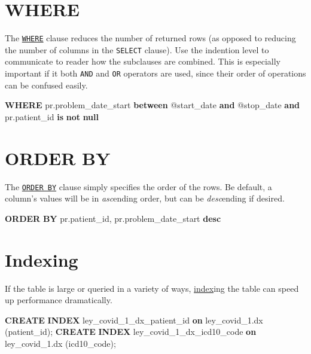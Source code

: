 \documentclass[
]{book}
\newenvironment{Shaded}{\begin{snugshade}}{\end{snugshade}}
\newcommand{\KeywordTok}[1]{\textcolor[rgb]{0.13,0.29,0.53}{\textbf{#1}}}
\newcommand{\NormalTok}[1]{#1}
\begin{document}
\hypertarget{sql-where}{%
\section{WHERE}\label{sql-where}}

The \href{https://www.w3schools.com/sql/sql_where.asp}{\texttt{WHERE}} clause reduces the number of returned rows (as opposed to reducing the number of columns in the \texttt{SELECT} clause). Use the indention level to communicate to reader how the subclauses are combined. This is especially important if it both \texttt{AND} and \texttt{OR} operators are used, since their order of operations can be confused easily.

\begin{Shaded}
\begin{Highlighting}[]
\KeywordTok{WHERE}
\NormalTok{  pr.problem\_date\_start }\KeywordTok{between}\NormalTok{ @start\_date }\KeywordTok{and}\NormalTok{ @stop\_date}
  \KeywordTok{and}
\NormalTok{  pr.patient\_id }\KeywordTok{is} \KeywordTok{not} \KeywordTok{null}
\end{Highlighting}
\end{Shaded}

\hypertarget{sql-order-by}{%
\section{ORDER BY}\label{sql-order-by}}

The \href{https://www.w3schools.com/sql/sql_orderby.asp}{\texttt{ORDER\ BY}} clause simply specifies the order of the rows. Be default, a column's values will be in \emph{asc}ending order, but can be \emph{desc}ending if desired.

\begin{Shaded}
\begin{Highlighting}[]
\KeywordTok{ORDER} \KeywordTok{BY}\NormalTok{ pr.patient\_id, pr.problem\_date\_start }\KeywordTok{desc}
\end{Highlighting}
\end{Shaded}

\hypertarget{sql-indexing}{%
\section{Indexing}\label{sql-indexing}}

If the table is large or queried in a variety of ways, \href{}{index}ing the table can speed up performance dramatically.

\begin{Shaded}
\begin{Highlighting}[]
\KeywordTok{CREATE} \KeywordTok{INDEX}\NormalTok{ ley\_covid\_1\_dx\_patient\_id }\KeywordTok{on}\NormalTok{ ley\_covid\_1.dx (patient\_id);}
\KeywordTok{CREATE} \KeywordTok{INDEX}\NormalTok{ ley\_covid\_1\_dx\_icd10\_code }\KeywordTok{on}\NormalTok{ ley\_covid\_1.dx (icd10\_code);}
\end{Highlighting}
\end{Shaded}
\end{document}
